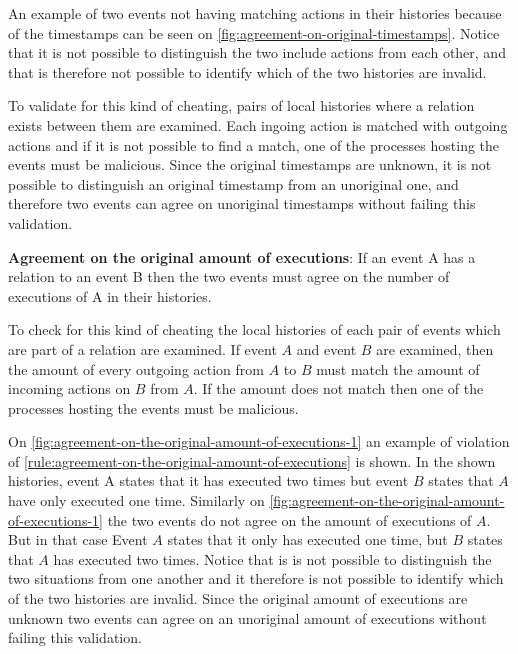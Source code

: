 	An example of two events not having matching actions in their histories because of the timestamps can be seen on \autoref{fig:agreement-on-original-timestamps}. Notice that it is not possible to distinguish the two include actions from each other, and that is therefore not possible to identify which of the two histories are invalid.
	
	\newpar To validate for this kind of cheating, pairs of local histories where a relation exists between them are examined. Each ingoing action is matched with outgoing actions and if it is not possible to find a match, one of the processes hosting the events must be malicious. Since the original timestamps are unknown, it is not possible to distinguish an original timestamp from an unoriginal one, and therefore two events can agree on unoriginal timestamps without failing this validation.
	
	\begin{ruledef}
		\textbf{Agreement on the original amount of executions}: If an event A has a relation to an event B then the two events must agree on the number of executions of A in their histories.%
		\label{rule:agreement-on-the-original-amount-of-executions}
	\end{ruledef}
	
	\noindent To check for this kind of cheating the local histories of each pair of events which are part of a relation are examined. If event $A$ and event $B$ are examined, then the amount of every outgoing action from $A$ to $B$ must match the amount of incoming actions on $B$ from $A$. If the amount does not match then one of the processes hosting the events must be malicious.
	
	\newpar On \autoref{fig:agreement-on-the-original-amount-of-executions-1} an example of violation of \autoref{rule:agreement-on-the-original-amount-of-executions} is shown. In the shown histories, event A states that it has executed two times but event $B$ states that $A$ have only executed one time. Similarly on \autoref{fig:agreement-on-the-original-amount-of-executions-1} the two events do not agree on the amount of executions of $A$. But in that case Event $A$ states that it only has executed one time, but $B$ states that $A$ has executed two times. Notice that is is not possible to distinguish the two situations from one another and it therefore is not possible to identify which of the two histories are invalid. Since the original amount of executions are unknown two events can agree on an unoriginal amount of executions without failing this validation. 
	
